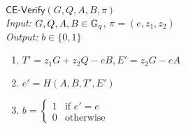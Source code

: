 \noindent\underline{$\mathsf{CE}\text{-}\mathsf{Verify}(G, Q, A, B, \pi)$}\\
\textit{Input:} $G, Q, A, B \in \mathbb{G}_q$, $\pi = (e, z_1, z_2)$\\
\textit{Output:} $b \in \{0, 1\}$
\vspace{-\topsep}
\begin{enumerate}
\item $T' = z_1 G + z_2 Q - e B, E' = z_2 G - e A$
\item $e' = H(A, B, T', E')$
\item $b = \begin{cases}
1 & \text{if $e' = e$}\\
0 & \text{otherwise}
\end{cases}$
\end{enumerate}
\fi